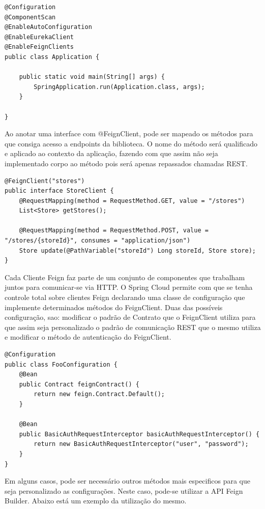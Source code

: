 \begin{verbatim}
@Configuration
@ComponentScan
@EnableAutoConfiguration
@EnableEurekaClient
@EnableFeignClients
public class Application {

    public static void main(String[] args) {
        SpringApplication.run(Application.class, args);
    }

}
\end{verbatim}

Ao anotar uma interface com @FeignClient, pode ser mapeado os métodos para que consiga acesso a endpoints da biblioteca. O nome do método será qualificado e aplicado ao contexto da aplicação, fazendo com que assim não seja implementado corpo ao método pois será apenas repassados chamadas REST.

\begin{verbatim}
@FeignClient("stores")
public interface StoreClient {
    @RequestMapping(method = RequestMethod.GET, value = "/stores")
    List<Store> getStores();

    @RequestMapping(method = RequestMethod.POST, value = "/stores/{storeId}", consumes = "application/json")
    Store update(@PathVariable("storeId") Long storeId, Store store);
}
\end{verbatim}

Cada Cliente Feign faz parte de um conjunto de componentes que trabalham juntos para comunicar-se via HTTP. O Spring Cloud permite com que se tenha controle total sobre clientes Feign declarando uma classe de configuração que implemente determinados métodos do FeignClient. Duas das possíveis configuração, sao: modificar o padrão de Contrato que o FeignClient utiliza para que assim seja personalizado o padrão de comunicação REST que o mesmo utiliza e modificar o método de autenticação do FeignClient.

\begin{verbatim}
@Configuration
public class FooConfiguration {
    @Bean
    public Contract feignContract() {
        return new feign.Contract.Default();
    }

    @Bean
    public BasicAuthRequestInterceptor basicAuthRequestInterceptor() {
        return new BasicAuthRequestInterceptor("user", "password");
    }
}
\end{verbatim}

Em alguns casos, pode ser necessário outros métodos mais especificos para que seja personalizado as configurações. Neste caso, pode-se utilizar a API Feign Builder. Abaixo está um exemplo da utilização do mesmo.


